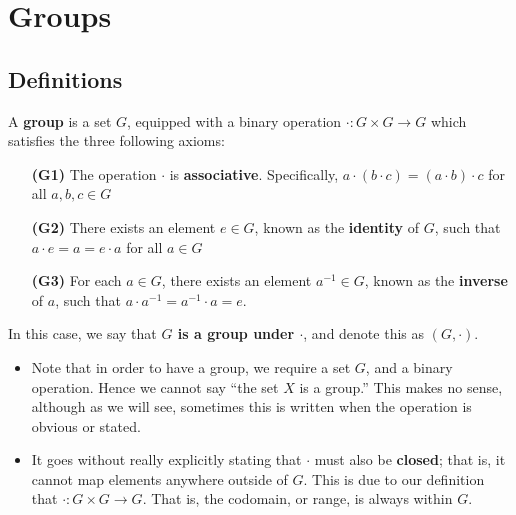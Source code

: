 \chapter{Groups}

\section{Definitions}
\begin{definition}
A \textbf{group} is a set $G$, equipped with a binary operation
$\cdot : G \times G \to G$ which satisfies the three following axioms:

\begin{enumerate}
    \item[\textbf{(G1)}] The operation $\cdot$ is \textbf{associative}. Specifically, $a \cdot (b \cdot c) = (a \cdot b) \cdot c$ for all $a, b, c
    \in G$

    \item[\textbf{(G2)}] There exists an element $e \in G$, known as the
    \textbf{identity} of $G$, such that $a \cdot e = a = e \cdot a$
    for all $a \in G$ 

    \item[\textbf{(G3)}] For each $a \in G$, there exists an element $a^{-1} \in G$, 
    known as the \textbf{inverse} of $a$, such that $a \cdot a^{-1} =
    a^{-1} \cdot a = e$. 
\end{enumerate}
In this case, we say that \textbf{$G$ is a group under $\cdot$}, and denote
this  as $(G, \cdot)$.
\end{definition}

\begin{remark}
    \begin{itemize}
        \item Note that in order to have a group, we require a set $G$, and
        a binary operation. Hence we cannot say ``the set $X$ is a group.'' This
        makes no sense, although as we will see, sometimes this is written
        when the operation is obvious or stated.
    
        \item
        It goes without really explicitly stating that 
        $\cdot$ must also be \textbf{closed}; that is, it
        cannot map elements anywhere outside of $G$. This is due to our 
        definition that $\cdot : G \times G \to G$. That is, the
        codomain, or range, is always within $G$.
    \end{itemize}
\end{remark}

